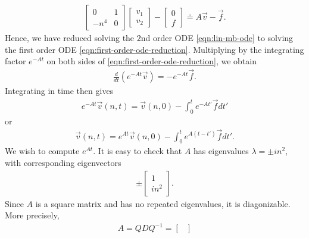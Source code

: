\documentclass[12pt,reqno]{amsart}
\numberwithin{equation}{section}  %
\begin{document}
\begin{appendices}
\begin{equation}
\begin{split}
\begin{bmatrix}
0 & 1 \\
-n^{4} & 0
\end{bmatrix}
\begin{bmatrix}
  v_{1}\\
  v_{2}
\end{bmatrix}
-
\begin{bmatrix}
0\\
f
\end{bmatrix}
\doteq A \vec v - \vec f.
\end{split}
\label{eqn:first-order-ode-reduction}
\end{equation}
%
%
Hence, we have reduced solving the $2$nd order ODE \eqref{eqn:lin-mb-ode} to
solving the first order ODE \eqref{eqn:first-order-ode-reduction}. Multiplying
by the integrating factor $e^{-At}$ on both sides of
\eqref{eqn:first-order-ode-reduction}, we obtain
%
%
\begin{equation*}
\begin{split}
  \frac{d}{dt}(e^{-At} \vec v) = -e^{-At} \vec f.
\end{split}
\end{equation*}
%
%
Integrating in time then gives
%
%
\begin{equation*}
\begin{split}
  e^{-At} \vec v(n, t) = \vec v(n, 0) - \int_{0}^{t}e^{-At'} \vec f dt'
\end{split}
\end{equation*}
%
%
or
%
%
\begin{equation}
  \label{ode-vec-soln}
\begin{split}
  \vec v(n, t) = e^{At} \vec v(n, 0) - \int_{0}^{t}e^{A(t - t')} \vec f dt'.
\end{split}
\end{equation}
%
%
We wish to compute $e^{At}$. It is easy to check that $A$ has eigenvalues
$\lambda = \pm in^{2}$, with corresponding eigenvectors 
%
%
\begin{equation*}
\begin{split}
\pm \begin{bmatrix}
1 \\
in^{2}
\end{bmatrix}.
\end{split}
\end{equation*}
%
%
Since $A$ is a square matrix and has no repeated
eigenvalues, it is diagonizable. More precisely,
%
%
%
%
\begin{equation*}
\begin{split}
  A = Q D Q^{-1} = 
  \begin{bmatrix}

\end{bmatrix}
\end{split}
\end{equation*}
\end{appendices}
\end{document}
